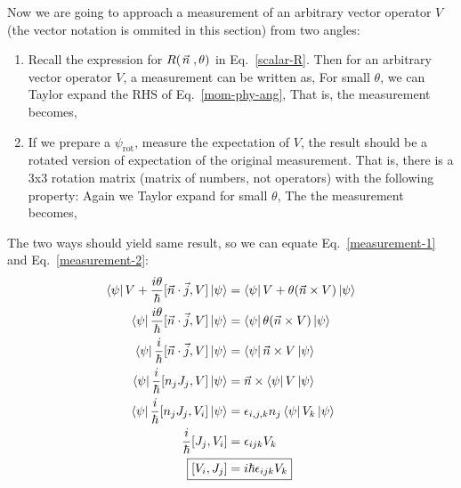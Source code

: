 \documentclass{school-22.101-notes}
\begin{document}
\clearpage
{}
Now we are going to approach a measurement of an arbitrary vector operator $V$(the vector notation is ommited in this section) from two angles:
\begin{enumerate}
\item Recall the expression for $R(\left.\vec{n}\right., \theta)$ in Eq.~\ref{scalar-R}. Then for an arbitrary vector operator $V$, a measurement can be written as, 
For small $\theta$, we can Taylor expand the RHS of Eq.~\ref{mom-phy-ang}, 
That is, the measurement becomes, 

\item If we prepare a $\psi_{\mathrm{rot}}$, measure the expectation of $V$, the result should be a rotated version of expectation of the original measurement. That is, there is a 3x3 rotation matrix (matrix of numbers, not operators) with the following property: 
Again we Taylor expand for small $\theta$, 
The the measurement becomes, 
\end{enumerate}
The two ways should yield same result, so we can equate Eq.~\ref{measurement-1} and Eq.~\ref{measurement-2}: 
\begin{align}
\bra{\psi} V + \frac{i \theta}{\hbar} [\vec{n} \cdot \vec{j}, V] \ket{\psi}  &=  \bra{\psi} V + \theta (\vec{n} \cross V ) \ket{\psi} \\
\bra{\psi}  \frac{i \theta}{\hbar} [\vec{n} \cdot \vec{j}, V] \ket{\psi}  &=  \bra{\psi} \theta (\vec{n} \cross V ) \ket{\psi} \\
\bra{\psi}  \frac{i}{\hbar} [\vec{n} \cdot \vec{j}, V] \ket{\psi}  &=  \bra{\psi} \vec{n} \cross V \ket{\psi} \\
\bra{\psi} \frac{i}{\hbar} [n_j J_j, V] \ket{\psi}  &= \vec{n} \cross \bra{\psi} V \ket{\psi} \\
\bra{\psi} \frac{i}{\hbar} [n_j J_j, V_i] \ket{\psi} &= \epsilon_{i,j,k} n_j \bra{\psi} V_k \ket{\psi} \\
\frac{i}{\hbar} [J_j, V_i] &= \epsilon_{ijk} V_k \\
\Aboxed{ [V_i, J_j] &= i \hbar \epsilon_{ijk} V_k }  \label{J-basic}
\end{align}
\end{document}
